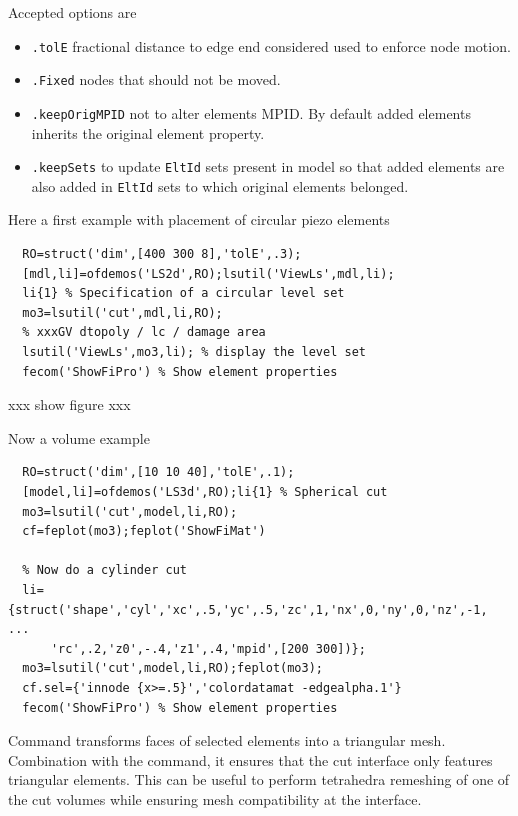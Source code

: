 
Accepted options are

\begin{itemize}
\item {\tt .tolE}  fractional distance to edge end considered used to
enforce node motion. 
\item {\tt .Fixed} nodes that should not be moved.
\item {\tt .keepOrigMPID} not to alter elements MPID.  By default added elements inherits the original element property.
\item {\tt .keepSets} to update {\tt EltId} sets present in model so that added elements are also added in {\tt EltId} sets to which original elements belonged.

\end{itemize}

Here a first example with placement of circular piezo elements 

\begin{verbatim}
  RO=struct('dim',[400 300 8],'tolE',.3);
  [mdl,li]=ofdemos('LS2d',RO);lsutil('ViewLs',mdl,li);
  li{1} % Specification of a circular level set
  mo3=lsutil('cut',mdl,li,RO);
  % xxxGV dtopoly / lc / damage area 
  lsutil('ViewLs',mo3,li); % display the level set
  fecom('ShowFiPro') % Show element properties
\end{verbatim}%

xxx show figure xxx 

Now a volume example

\begin{verbatim}
  RO=struct('dim',[10 10 40],'tolE',.1);
  [model,li]=ofdemos('LS3d',RO);li{1} % Spherical cut
  mo3=lsutil('cut',model,li,RO);
  cf=feplot(mo3);feplot('ShowFiMat')
  
  % Now do a cylinder cut
  li={struct('shape','cyl','xc',.5,'yc',.5,'zc',1,'nx',0,'ny',0,'nz',-1, ...
      'rc',.2,'z0',-.4,'z1',.4,'mpid',[200 300])};
  mo3=lsutil('cut',model,li,RO);feplot(mo3);
  cf.sel={'innode {x>=.5}','colordatamat -edgealpha.1'}
  fecom('ShowFiPro') % Show element properties
\end{verbatim}%


\vs

Command  transforms faces of selected elements into a triangular mesh. Combination with the  command, it ensures that the cut interface only features triangular elements. This can be useful to perform tetrahedra remeshing of one of the cut volumes while ensuring mesh compatibility at the interface.


